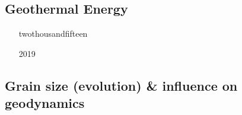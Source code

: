 \subsection{Geothermal Energy} 

\begin{scriptsize}
\begin{itemize}
\item[twothousandfifteen]
\textcite{quxm15}  
\item[2019]
\textcite{revf19} 
\end{itemize}
\end{scriptsize}

\subsection{Grain size (evolution) \& influence on geodynamics}
\label{sec:topics:gsev}

